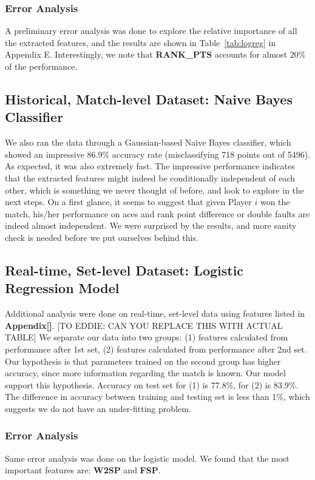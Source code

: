 \documentclass[paper=a4, fontsize=11pt]{scrartcl} %
\numberwithin{equation}{section} %
\numberwithin{figure}{section} %
\numberwithin{table}{section} %
\begin{document}
\subsubsection{Error Analysis}
A preliminary error analysis was done to explore the relative importance of all the extracted features, and the results are shown in Table~\ref{tab:logreg} in Appendix E. Interestingly, we note that \textbf{RANK\_PTS} accounts for almost $20\%$ of the performance. 
\subsection{Historical, Match-level Dataset: Naive Bayes Classifier}
We also ran the data through a Gaussian-based Naive Bayes classifier, which showed an impressive 86.9\% accuracy rate (misclassifying 718 points out of 5496). As expected, it was also extremely fast. The impressive performance indicates that the extracted features might indeed be conditionally independent of each other, which is something we never thought of before, and look to explore in the next steps. On a first glance, it seems to suggest that given Player $i$ won the match, his/her performance on aces and rank point difference or double faults are indeed almost independent. We were surprised by the results, and more sanity check is needed before we put ourselves behind this. 
\subsection{Real-time, Set-level Dataset: Logistic Regression Model}
Additional analysis were done on real-time, set-level data using features listed in \textbf{Appendix[]}. [TO EDDIE: CAN YOU REPLACE THIS WITH ACTUAL TABLE] We separate our data into two groups: (1) features calculated from performance after 1st set, (2) features calculated from performance after 2nd set.  Our hypothesis is that parameters trained on the second group has higher accuracy, since more information regarding the match is known.  Our model support this hypothesis.  Accuracy on test set for (1) is 77.8\%, for (2) is 83.9\%.  The difference in accuracy between training and testing set is less than 1\%, which suggests we do not have an under-fitting problem.
\subsubsection{Error Analysis}
Same error analysis was done on the logistic model.  We found that the most important features are: \textbf{W2SP} and \textbf{FSP}.
\end{document}
